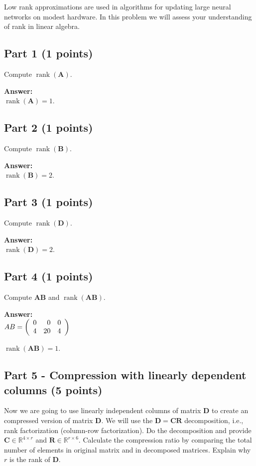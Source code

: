 \documentclass[11pt, oneside]{article}   	%
\begin{document}
Low rank approximations are used in algorithms for updating large neural networks on modest hardware. In this problem we will assess your understanding of rank in linear algebra.


\subsection*{Part 1 (1 points)}
Compute $\operatorname{rank}(\mathbf{A})$.

\textbf{Answer:} \\
$\operatorname{rank}(\mathbf{A}) = 1$.

\subsection*{Part 2 (1 points)}
Compute $\operatorname{rank}(\mathbf{B})$.

\textbf{Answer:} \\
$\operatorname{rank}(\mathbf{B}) = 2$.

\subsection*{Part 3 (1 points)}
Compute $\operatorname{rank}(\mathbf{D})$.  

\textbf{Answer:} \\
$\operatorname{rank}(\mathbf{D}) = 2$.

\subsection*{Part 4 (1 points)}
Compute $\mathbf{AB}$ and $\operatorname{rank}(\mathbf{AB})$.  

\textbf{Answer:} \\
$AB = \left( {\begin{array}{*{20}r}
    0 & 0 & 0  \\
    4 & 20 & 4  \\
 \end{array}} \right)
$

$\operatorname{rank}(\mathbf{AB}) = 1$.


\subsection*{Part 5 - Compression with linearly dependent columns (5 points)}
Now we are going to use linearly independent columns of matrix $\mathbf{D}$ to create an compressed version of matrix $\mathbf{D}$. We will use the $\mathbf{D} = \mathbf{CR}$ decomposition, i.e., rank factorization  (column-row factorization). Do the decomposition and provide $\mathbf{C} \in \mathbb{R}^{4 \times r}$ and $\mathbf{R} \in \mathbb{R}^{r \times 6}$. Calculate the compression ratio by comparing the total number of elements in original matrix and in decomposed matrices. Explain why $r$ is the rank of $\mathbf{D}$.
\end{document}

